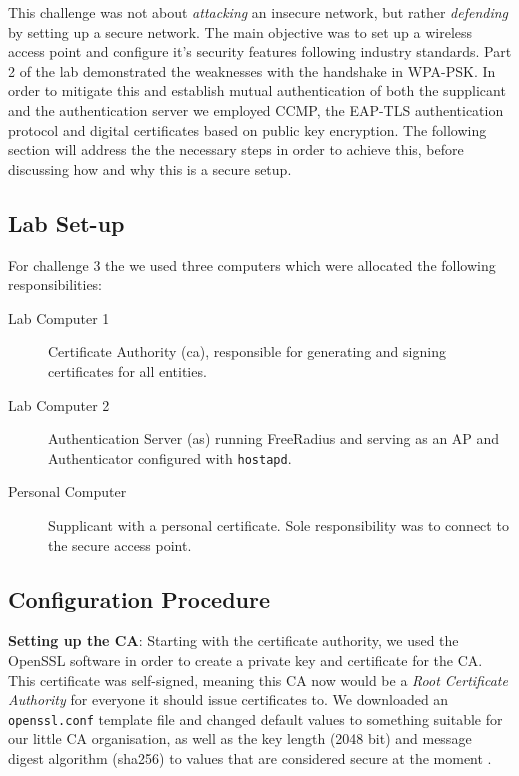 \documentclass[a4paper,11pt]{article}
\begin{document}
This challenge was not about \emph{attacking} an insecure network, but rather \emph{defending} by setting up a secure network. The main objective was to set up a wireless access point and configure it's security features following industry standards. Part 2 of the lab demonstrated the weaknesses with the handshake in WPA-PSK. In order to mitigate this and establish mutual authentication of both the supplicant and the authentication server we employed CCMP, the EAP-TLS authentication protocol and digital certificates based on public key encryption. The following section will address the the necessary steps in order to achieve this, before discussing how and why this is a secure setup.

\subsection{Lab Set-up} %
\label{sub:lab_set_up}

For challenge 3 the we used three computers which were allocated the following responsibilities:
\begin{description}
	\item[Lab Computer 1] Certificate Authority (\gls{ca}), responsible for generating and signing certificates for all entities.
	\item[Lab Computer 2] Authentication Server (\gls{as}) running FreeRadius and serving as an AP and Authenticator configured with \texttt{hostapd}.
	\item[Personal Computer] Supplicant with a personal certificate. Sole responsibility was to connect to the secure access point. 
\end{description}

\subsection{Configuration Procedure} %
\label{sub:configuration_procedure}

\textbf{Setting up the CA}: Starting with the certificate authority, we used the OpenSSL software in order to create a private key and certificate for the CA. This certificate was self-signed, meaning this CA now would be a \emph{Root Certificate Authority} \cite{rootca} for everyone it should issue certificates to. We downloaded an \texttt{openssl.conf} template file \cite{openssl-conf} and changed default values to something suitable for our little CA organisation, as well as the key length (2048 bit) and message digest algorithm (sha256) to values that are considered secure at the moment \cite{cookbook}. 
\end{document}
